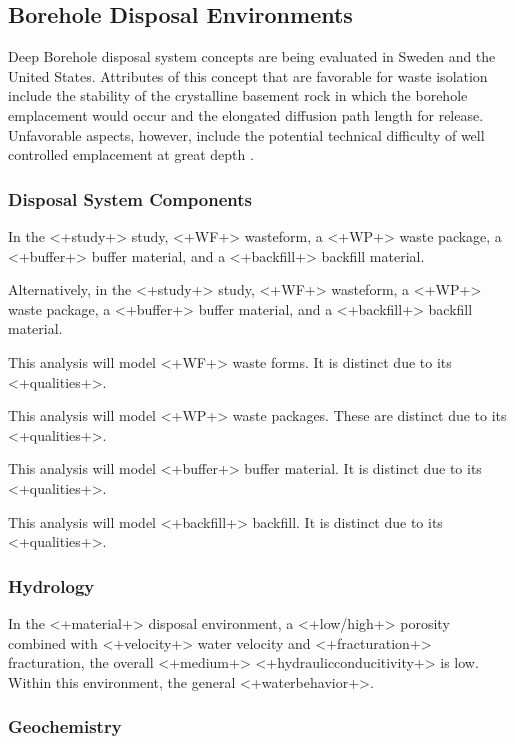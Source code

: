 {\subsection{Borehole Disposal Environments}

Deep Borehole disposal system concepts are being evaluated in Sweden and the 
United States. Attributes of this concept that are favorable for waste 
isolation include the stability of the crystalline basement rock in which the 
borehole emplacement would occur and the elongated diffusion path length for 
release. Unfavorable aspects, however, include the potential technical 
difficulty of well controlled emplacement at great depth 
\cite{hardin_generic_2011}.




\subsubsection{Disposal System Components}
In the <+study+> study, <+WF+> wasteform, a <+WP+> waste package, a <+buffer+> 
buffer material, and a <+backfill+> backfill material.

Alternatively, in the <+study+> study, <+WF+> wasteform, a <+WP+> waste package, a <+buffer+> 
buffer material, and a <+backfill+> backfill material.

This analysis will model <+WF+> waste forms. It is distinct due to its 
<+qualities+>.

This analysis will model <+WP+> waste packages. These are distinct due to its 
<+qualities+>.

This analysis will model <+buffer+> buffer material. It is distinct due to its 
<+qualities+>.

This analysis will model <+backfill+> backfill. It is distinct due to its 
<+qualities+>.

\subsubsection{Hydrology}

In the <+material+> disposal environment, a <+low/high+> porosity combined with 
<+velocity+> water velocity and <+fracturation+> fracturation, the overall 
<+medium+> <+hydraulicconducitivity+> is low. Within this environment, the  
general <+waterbehavior+>.

\subsubsection{Geochemistry}

}
